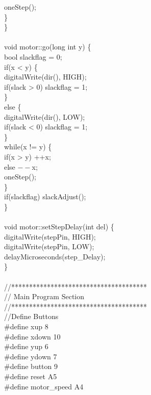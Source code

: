 \tabto*{1cm} oneStep();\\
\tabto*{.5cm} \}\\
\}\\
\\
void motor::go(long int y) \{\\
\tabto*{.5cm} bool slackflag = 0;\\
\tabto*{.5cm} if(x < y) \{\\
\tabto*{1cm} digitalWrite(dir(), HIGH);\\
\tabto*{1cm} if(slack > 0) slackflag = 1;\\
\tabto*{.5cm} \}\\
\tabto*{.5cm} else \{\\
\tabto*{1cm} digitalWrite(dir(), LOW);\\
\tabto*{1cm} if(slack < 0) slackflag = 1;\\
\tabto*{.5cm} \}\\
\tabto*{.5cm} while(x != y) \{\\
\tabto*{1cm} if(x > y) ++x;\\
\tabto*{1cm} else $--$x;\\
\tabto*{1cm} oneStep();\\
\tabto*{.5cm} \}\\
\tabto*{.5cm} if(slackflag) slackAdjust();\\
\}\\
\\
void motor::setStepDelay(int del) \{\\
\tabto*{.5cm} digitalWrite(stepPin, HIGH);\\
\tabto*{.5cm} digitalWrite(stepPin, LOW);\\
\tabto*{.5cm} delayMicroseconds(step\_Delay);\\
\}\\
\\
//**************************************\\
//   Main Program Section\\
//**************************************\\
//Define Buttons\\
\#define xup 8\\
\#define xdown 10\\
\#define yup 6\\
\#define ydown 7\\
\#define button 9\\
\#define reset A5\\
\#define motor\_speed A4\\
\\
